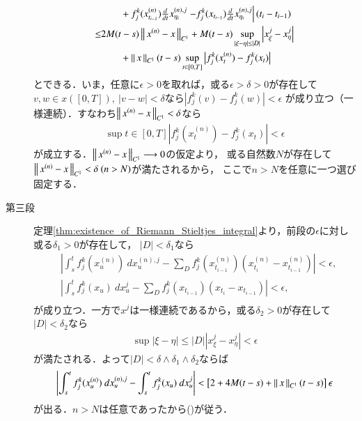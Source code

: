 \begin{prf}
\begin{description}
\begin{align}
					&\qquad + f^k_j(x^{(n)}_{t_{i-1}}) \tfrac{d}{dt}x^{(n),j}_{\eta_i}
					\left. - f^k_j(x_{t_{i-1}}) \tfrac{d}{dt}x^{(n),j}_{\eta_i} \right|(t_i - t_{i-1}) \\
				\leq &2M (t - s) \left\|\, x^{(n)} - x\, \right\|_{C^1}
					+ M(t-s) \operatorname*{sup}_{|\xi - \eta| \leq |D|} \left|x^j_\xi - x^j_\eta \right| \\
					&\qquad + \left\|\, x\, \right\|_{C^1}(t-s)\operatorname*{sup}_{t \in [0,T]} \left|f^k_j(x^{(n)}_t) - f^k_j(x_t) \right|
			\end{align}
			とできる．いま，任意に$\epsilon > 0$を取れば，或る$\epsilon > \delta > 0$が存在して
			$v,w \in x([0,T]),\ |v - w| < \delta$なら$|f^k_j(v) - f^k_j(w)| < \epsilon$
			が成り立つ（一様連続）．すなわち$\left\|\, x^{(n)} - x\, \right\|_{C^1} < \delta$なら
			\begin{align}
				\sup{t \in [0,T]}{\left|f^k_j(x^{(n)}_t) - f^k_j(x_t) \right|} < \epsilon
			\end{align}
			が成立する．$\left\|\, x^{(n)} - x\, \right\|_{C^1} \longrightarrow 0$の仮定より，
			或る自然数$N$が存在して$\left\|\, x^{(n)} - x\, \right\|_{C^1} < \delta\ (n > N)$が満たされるから，
			ここで$n > N$を任意に一つ選び固定する．
		
		\item[第三段] 定理\ref{thm:existence_of_Riemann_Stieltjes_integral}より，前段の$\epsilon$に対し或る$\delta_1 > 0$が存在して，
			$|D| < \delta_1$なら
			\begin{align}
				&\left| \int_s^t f^k_j(x^{(n)}_u)\ dx^{(n),j}_u
					- \sum_D f^k_j(x^{(n)}_{t_{i-1}})(x^{(n)}_{t_i} - x^{(n)}_{t_{i-1}}) \right| < \epsilon, \\
				&\left| \int_s^t f^k_j(x_u)\ dx^j_u
					- \sum_D f^k_j(x_{t_{i-1}})(x_{t_i} - x_{t_{i-1}}) \right| < \epsilon, \\
			\end{align}
			が成り立つ．一方で$x^j$は一様連続であるから，或る$\delta_2 > 0$が存在して
			$|D| < \delta_2$なら
			\begin{align}
				\sup{|\xi - \eta| \leq |D|}{\left|x^j_\xi - x^j_\eta \right|} < \epsilon
			\end{align}
			が満たされる．よって$|D| < \delta \wedge \delta_1 \wedge \delta_2$ならば
			\begin{align}
				\left| \int_s^t f^k_j(x^{(n)}_u)\ dx^{(n),j}_u
					- \int_s^t f^k_j(x_u)\ dx^j_u \right|
				< \left[2 + 4M(t-s) + \left\|\, x\, \right\|_{C^1}(t-s) \right] \epsilon
			\end{align}
			が出る．$n > N$は任意であったから()が従う．
			\QED
	\end{description}
\end{prf}

